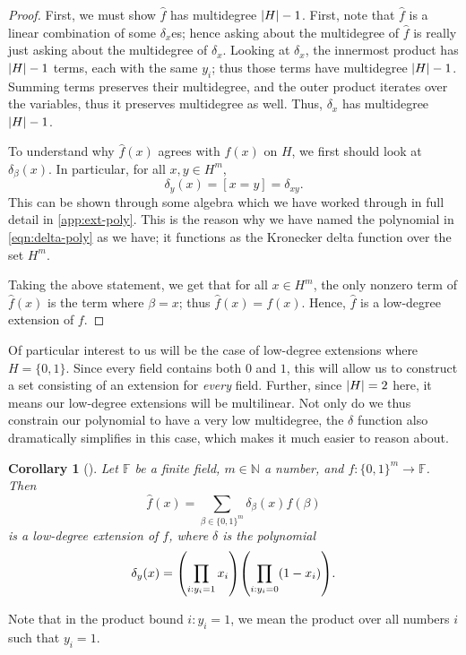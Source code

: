 \documentclass[english,12pt]{reedthesis}
\theoremstyle{plain}
\newtheorem{cor}[cor]{Corollary}
\theoremstyle{definition}
\theoremstyle{remark}
\DeclarePairedDelimiter{\abs}{\lvert}{\rvert}
\begin{document}
\begin{proof}
  First, we must show $\hat{f}$ has multidegree $\abs{H} - 1$. First, note that
  $\hat{f}$ is a linear combination of some $\delta_{x}$es; hence asking about the
  multidegree of $\hat{f}$ is really just asking about the multidegree of
  $\delta_{x}$. Looking at $\delta_{x}$, the innermost product has $\abs{H} - 1$ terms,
  each with the same $y_{i}$; thus those terms have multidegree $\abs{H} - 1$.
  Summing terms preserves their multidegree, and the outer product iterates over
  the variables, thus it preserves multidegree as well. Thus, $\delta_{x}$ has
  multidegree $\abs{H} - 1$.

  To understand why $\hat{f}(x)$ agrees with $f(x)$ on $H$, we first should look
  at $\delta_{\beta}(x)$. In particular, for all $x, y \in H^{m}$,
  \begin{equation}\label{eqn:delta-is-delta}
    \delta_{y}(x) = [x = y] = \delta_{xy}.
  \end{equation}
  This can be shown through some algebra which we have worked through in full
  detail in \cref{app:ext-poly}. This is the reason why we have named the
  polynomial in \cref{eqn:delta-poly} as we have; it functions as the Kronecker
  delta function over the set $H^{m}$.

  Taking the above statement, we get that for all $x \in H^{m}$, the only nonzero
  term of $\hat{f}(x)$ is the term where $\beta = x$; thus $\hat{f}(x) = f(x)$.
  Hence, $\hat{f}$ is a low-degree extension of $f$.
\end{proof}

Of particular interest to us will be the case of low-degree extensions where
$H = \{0, 1\}$. Since every field contains both $0$ and $1$, this will allow us
to construct a set consisting of an extension for \emph{every} field. Further,
since $\abs{H} = 2$ here, it means our low-degree extensions will be
multilinear. Not only do we thus constrain our polynomial to have a very low
multidegree, the $\delta$ function also dramatically simplifies in this case, which
makes it much easier to reason about.

\begin{cor}[{\cite[]{AW09}}]\label{cor:low-degree-boolean}
  Let $\mathbb{F}$ be a finite field, $m \in \mathbb{N}$ a number, and
  $f: \{0, 1\}^{m} \rightarrow \mathbb{F}$. Then
  \begin{equation}\label{eqn:low-deg-ext-small}
    \hat{f}(x) = \sum_{\beta \in \{0, 1\}^{m}}\delta_{\beta}(x)f(\beta)
  \end{equation}
  is a low-degree extension of $f$, where $\delta$ is the polynomial
  \begin{equation}\label{eqn:delta-poly-small}
    \delta_{y}(x) = \mleft(\prod_{i:y_{i}=1}x_{i}\mright)\mleft(\prod_{i:y_{i}=0}(1 - x_{i})\mright).
  \end{equation}
\end{cor}
Note that in the product bound $i:y_{i} = 1$, we mean the product over all
numbers $i$ such that $y_{i} = 1$.
\end{document}
